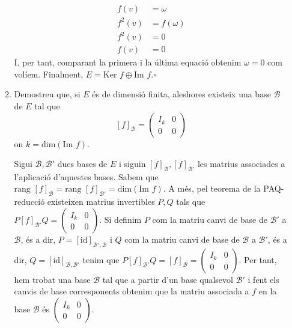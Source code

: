 \documentclass[11pt,a4paper]{article}
\newcommand*{\QED}{\hfill\ensuremath{\square}}
\begin{document}
\begin{enumerate}
\begin{enumerate}
        \begin{align*}
            f(v)&=\omega\\
            f^2(v)&=f(\omega)\\
            f^2(v)&=0\\
            f(v)&=0
        \end{align*}
        I, per tant, comparant la primera i la última equació obtenim $\omega=0$ com volíem. Finalment, $E=\text{Ker }f\oplus\text{Im }f$.\QED
        \item Demostreu que, si $E$ és de dimensió finita, aleshores existeix una base $\mathcal{B}$ de $E$ tal que 
        $$[f]_\mathcal{B}=
        \begin{pmatrix}
        I_k & 0\\
        0 & 0
        \end{pmatrix}$$ on $k=\text{dim}(\text{Im }f)$.\par
        Sigui $\mathcal{B},\mathcal{B'}$ dues bases de $E$ i siguin $[f]_\mathcal{B},[f]_\mathcal{B'}$ les matrius associades a l'aplicació d'aquestes bases. Sabem que $\text{rang }[f]_\mathcal{B}=\text{rang }[f]_\mathcal{B'}=\text{dim}(\text{Im }f)$. A més, pel teorema de la PAQ-reducció existeixen matrius invertibles $P,Q$ tals que $P[f]_\mathcal{B'}Q=\begin{pmatrix}
        I_k & 0\\
        0 & 0
        \end{pmatrix}$. Si definim $P$ com la matriu canvi de base de $\mathcal{B'}$ a $\mathcal{B}$, és a dir, $P=[\text{id}]_{\mathcal{B'},\mathcal{B}}$  i $Q$ com la matriu canvi de base de $\mathcal{B}$ a $\mathcal{B'}$, és a dir, $Q=[\text{id}]_{\mathcal{B},\mathcal{B'}}$ tenim que $P[f]_\mathcal{B'}Q=[f]_\mathcal{B}=\begin{pmatrix}
        I_k & 0\\
        0 & 0
        \end{pmatrix}$. Per tant, hem trobat una base $\mathcal{B}$ tal que a partir d'un base qualsevol $\mathcal{B'}$ i fent els canvis de base corresponents obtenim que la matriu associada a $f$ en la base $\mathcal{B}$ és $\begin{pmatrix}
        I_k & 0\\
        0 & 0
        \end{pmatrix}$. 
    \end{enumerate}
    

\end{enumerate}
\end{document}

